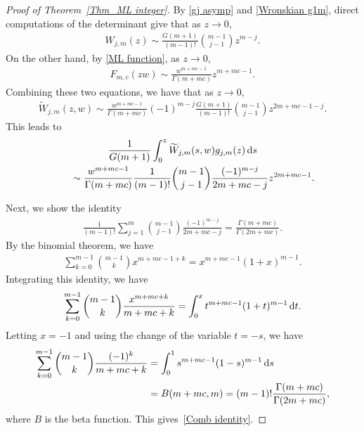 \documentclass[pdftex]{sigma}
\numberwithin{equation}{section}
\newcommand{\1}{\chi}
\begin{document}
\begin{proof}[Proof of Theorem~\ref{Thm_ML integer}]
	By \eqref{gj asymp} and \eqref{Wronskian g1m}, direct computations of the determinant give that as $z \to 0$,
	\begin{gather*}
	W_{j,m}(z) \sim \frac{G(m+1)}{(m-1)!} \binom{m-1}{j-1} z^{m-j}.
	\end{gather*}
	On the other hand, by \eqref{ML function}, as $z \to 0$,
	\begin{gather*}
	F_{m,c}(zw) \sim \frac{w^{m+mc-1}}{\Gamma(m+mc)} z^{m+mc-1}.
	\end{gather*}
	Combining these two equations, we have that as $z\to 0$,
	\begin{gather*}
	\widetilde{W}_{j,m}(z,w) \sim \frac{w^{m+mc-1}}{\Gamma(m+mc)} (-1)^{m-j} \frac{G(m+1)}{(m-1)!} \binom{m-1}{j-1} z^{2m+mc-1-j}.
	\end{gather*}
	This leads to
	\begin{gather*}
	\frac{1}{G(m+1)}\int_0^z \widetilde{W}_{j,m}(s,w) g_{j,m}(z)\,{\rm d}s\\
\qquad{} \sim \frac{w^{m+mc-1}}{\Gamma(m+mc)} \frac{1}{(m-1)!} \binom{m-1}{j-1} \frac{(-1)^{m-j} }{2m+mc-j} z^{2m+mc-1}.
	\end{gather*}
	
	Next, we show the identity
	\begin{gather}\label{Comb identity}
		\frac{1}{(m-1)!} \sum_{j=1}^{m} \binom{m-1}{j-1} \frac{(-1)^{m-j} }{2m+mc-j} = \frac{\Gamma(m+mc)}{\Gamma(2m+mc)}.
	\end{gather}
	By the binomial theorem, we have
	\begin{gather*}
	\sum_{k=0}^{m-1} \binom{m-1}{k} x^{m+mc-1+k} = x^{m+mc-1}(1+x)^{m-1}.
	\end{gather*}
	Integrating this identity, we have
	\begin{gather*}
	\sum_{k=0}^{m-1} \binom{m-1}{k} \frac{x^{m+mc+k}}{m+mc+k} = \int_0^x t^{m+mc-1}(1+t)^{m-1}\,{\rm d}t.
	\end{gather*}
	Letting $x=-1$ and using the change of the variable $t=-s$, we have
	\begin{align*}
		\sum_{k=0}^{m-1} \binom{m-1}{k} \frac{(-1)^{k}}{m+mc+k} &= \int_0^1 s^{m+mc-1}(1-s)^{m-1}\,{\rm d}s
		\\
		&=B(m+mc,m)=(m-1)! \frac{\Gamma(m+mc)}{\Gamma(2m+mc)},
	\end{align*}
	where $B$ is the beta function. This gives~\eqref{Comb identity}.
	

\end{proof}
\end{document}
